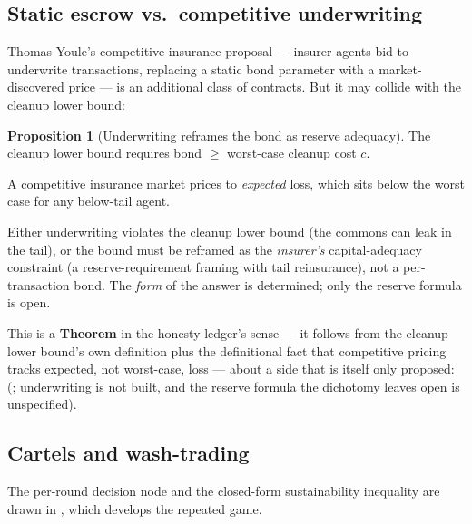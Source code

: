 \documentclass[11pt,a4paper]{article}
\theoremstyle{definition}
\newtheorem{proposition}{Proposition}[section]
\theoremstyle{definition}
\theoremstyle{remark}
\begin{document}


\subsection{Static escrow vs.\ competitive underwriting}\label{sec:fh-equilibria}\label{sec:youle:welfare}


%
Thomas Youle's competitive-insurance proposal --- insurer-agents bid to underwrite
transactions, replacing a static bond parameter with a market-discovered price --- is
an additional class of contracts. But it may collide with the cleanup lower bound:

\begin{proposition}[Underwriting reframes the bond as reserve adequacy]\label{prop:reserve}
\setlength{\parskip}{4pt plus 1pt}
The cleanup lower bound requires bond $\ge$ worst-case cleanup cost $c$. 

A
competitive insurance market prices to \emph{expected} loss, which sits below the
worst case for any below-tail agent. 

Either underwriting violates the cleanup lower
bound (the commons can leak in the tail), or the bound must be reframed as the
\emph{insurer's} capital-adequacy constraint (a reserve-requirement framing with
tail reinsurance), not a per-transaction bond. The \emph{form} of the answer is
determined; only the reserve formula is open. 

This is a \textbf{Theorem} in the
honesty ledger's sense --- it follows from the cleanup lower bound's own
definition plus the definitional fact that competitive pricing tracks expected,
not worst-case, loss --- about a side that is itself only proposed:
(\Designed{}; underwriting is not built, and the reserve formula the dichotomy
leaves open is unspecified).
\end{proposition}

\subsection{Cartels and wash-trading}\label{sec:fh-failure-modes}

\ifpdbook
The per-round decision node and the closed-form sustainability
inequality are drawn in , which develops the repeated game.
\else

\fi
\end{document}

